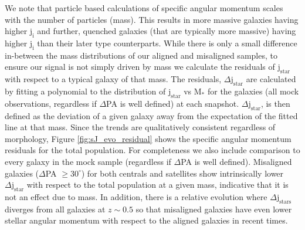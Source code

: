 We note that particle based calculations of specific angular momentum scales with the number of particles (mass). This results in more massive galaxies having higher $\mathrm{j_{i}}$ and further, quenched galaxies (that are typically more massive) having higher $\mathrm{j_{i}}$ than their later type counterparts. While there is only a small difference in-between the mass distributions of our aligned and misaligned samples, to ensure our signal is not simply driven by mass we calculate the residuals of $\mathrm{j_{star}}$ with respect to a typical galaxy of that mass. The residuals, $\Delta \mathrm{j_{star}}$ are calculated by fitting a polynomial to the distribution of $\mathrm{j_{star}}$ vs $\mathrm{M_{\ast}}$ for the galaxies (all mock observations, regardless if $\Delta$PA is well defined) at each snapshot. $\Delta \mathrm{j_{star}}$, is then defined as the deviation of a given galaxy away from the expectation of the fitted line at that mass. Since the trends are qualitatively consistent regardless of morphology, Figure \ref{fig:sJ_evo_residual} shows the specific angular momentum residuals for the total population. For completeness we also include comparison to every galaxy in the mock sample (regardless if $\Delta$PA is well defined). Misaligned galaxies ($\Delta$PA $\geq 30^{\circ}$) for both centrals and satellites show intrinsically lower $\Delta \mathrm{j_{star}}$ with respect to the total population at a given mass, indicative that it is not an effect due to mass. In addition, there is a relative evolution where $\Delta \mathrm{j_{stars}}$ diverges from all galaxies at $z \sim 0.5$ so that misaligned galaxies have even lower stellar angular momentum with respect to the aligned galaxies in recent times.

